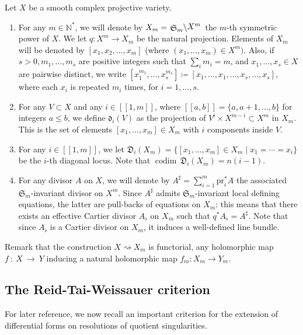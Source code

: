 \documentclass[JEP,XML,SOM,Unicode, NoEqCountersInSection,NoFloatCountersInSection,published]{cedram}
\newcommand{\llbracket}{[\![}
\newcommand{\rrbracket}{]\!]}
\newcommand{\pr}{\mathrm{pr}}
\DeclareMathOperator{\codim}{codim}
\theoremstyle{theorem}
\theoremstyle{definition}
\newcommand{\quotient}[2]{{\left.\raisebox{-.08em}{$#1$}\middle\backslash\raisebox{.08em}{$#2$}\right.}}
\begin{document}
Let $X$ be a smooth complex projective variety.
\begin{enumerate}
\item For any $m \in \mathbb N^\ast$, we will denote by $X_m = \quotient{\mathfrak{S}_m}{X^m}$ the $m$-th symmetric power of $X$. We let $q : X^m \to X_m$ be the natural projection. Elements of $X_m$ will be denoted by $[x_1, x_2,\dots, x_m]$ (where $(x_1,\dots, x_m) \in X^m)$. Also, if $s>0,m_1,\dots ,m_s$ are positive integers such that $\sum_im_i=m$, and $x_1,\dots,x_s\in X$ are pairwise distinct, we write $[x_1^{m_1},\dots,x_s^{m_s}]\coloneqq [x_1,\dots,x_1,\dots,x_s,\dots,x_s]$, where each $x_i$ is repeated $m_i$ times, for $i=1,\dots,s$.

\item For any $V \subset X$ and any $i\in\llbracket1, m\rrbracket$, where \(\llbracket a, b \rrbracket = \{ a, a+1, \dotsc, b\}\) for integers \(a \leq b\), we define \(\mathfrak{d}_i (V)\) as the projection of \(V^{i} \times X^{m-i} \subset X^{m}\) in \(X_{m}\). This is the set of elements \([x_{1}, \dots, x_{m}] \in X_{m}\) with \(i\) components inside \(V\).

\item For any $i\in\llbracket1, m\rrbracket$, we let $\mathfrak{D}_i(X_m) = \{ [x_1,\dots, x_m] \in X_m \mid x_1 =\cdots= x_i \}$ be the $i$-th diagonal locus. Note that $\codim \, \mathfrak{D}_i (X_m) = n(i - 1)$.

\item For any divisor $A$ on $X$, we will denote by $A^\sharp = \sum_{i=1}^m \pr_i^\ast A$ the associated $\mathfrak{S}_m$\nobreakdash-invariant divisor on $X^m$. Since \(A^{\sharp}\) admits \(\mathfrak{S}_{m}\)-invariant local defining equations, the latter are pull-backs of equations on \(X_{m}\): this means that there exists an effective Cartier divisor $A_\flat$ on \(X_{m}\) such that \(q^\ast A_\flat = A^{\sharp}\). Note that since $A_\flat$ is a Cartier divisor on $X_m$, it induces a well-defined line bundle.
\end{enumerate}

Remark that the construction $X \rightsquigarrow X_m$ is functorial, any holomorphic map $f~:~X~\to~Y$ inducing a natural holomorphic map $f_m : X_m \to Y_m$.

\subsection{The Reid-Tai-Weissauer criterion} \label{sectcrit} For later reference, we now recall an important criterion for the extension of differential forms on resolutions of quotient singularities.
\end{document}
